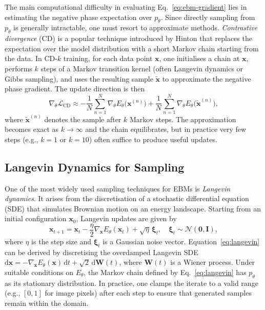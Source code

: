 The main computational difficulty in evaluating Eq.~\eqref{eq:ebm-gradient}
lies in estimating the negative phase expectation over $p_\theta$.  Since
directly sampling from $p_\theta$ is generally intractable, one must resort
to approximate methods.  \emph{Contrastive divergence} (CD) is a popular
technique introduced by Hinton that replaces the expectation over the model
distribution with a short Markov chain starting from the data.  In CD-$k$
training, for each data point $\mathbf{x}$, one initialises a chain at
$\mathbf{x}$, performs $k$ steps of a Markov transition kernel (often
Langevin dynamics or Gibbs sampling), and uses the resulting sample
$\tilde{\mathbf{x}}$ to approximate the negative phase gradient.  The
update direction is then
\begin{equation}
    \nabla_\theta \mathcal{L}_{\text{CD}} \approx -\frac{1}{N}\sum_{n=1}^N
    \nabla_\theta E_\theta\big(\mathbf{x}^{(n)}\big) +
    \frac{1}{N}\sum_{n=1}^N \nabla_\theta E_\theta\big(\tilde{\mathbf{x}}^{(n)}\big),
\end{equation}
where $\tilde{\mathbf{x}}^{(n)}$ denotes the sample after $k$ Markov steps.  The
approximation becomes exact as $k\to\infty$ and the chain equilibrates, but
in practice very few steps (e.g., $k=1$ or $k=10$) often suffice to
produce useful updates.

\subsection{Langevin Dynamics for Sampling}

One of the most widely used sampling techniques for EBMs is \emph{Langevin
dynamics}.  It arises from the discretisation of a stochastic differential
equation (SDE) that simulates Brownian motion on an energy landscape.
Starting from an initial configuration $\mathbf{x}_0$, Langevin updates are
given by
\begin{equation}
    \mathbf{x}_{t+1} = \mathbf{x}_t - \frac{\eta}{2}
    \nabla_{\mathbf{x}} E_\theta(\mathbf{x}_t) + \sqrt{\eta}\,\boldsymbol{\xi}_t,
    \quad \boldsymbol{\xi}_t \sim \mathcal{N}(\mathbf{0}, \mathbf{I}),
    \label{eq:langevin}
\end{equation}
where $\eta$ is the step size and $\boldsymbol{\xi}_t$ is a Gaussian noise
vector.  Equation~\eqref{eq:langevin} can be derived by discretising the
overdamped Langevin SDE $\mathrm{d}\mathbf{x} = -\nabla_{\mathbf{x}}
E_\theta(\mathbf{x})\,\mathrm{d}t + \sqrt{2}\,\mathrm{d}\mathbf{W}(t)$, where
$\mathbf{W}(t)$ is a Wiener process.  Under suitable conditions on
$E_\theta$, the Markov chain defined by Eq.~\eqref{eq:langevin} has
$p_\theta$ as its stationary distribution.  In practice, one clamps the
iterate to a valid range (e.g., $[0,1]$ for image pixels) after each step
to ensure that generated samples remain within the domain.

